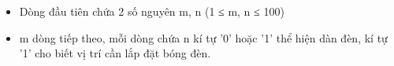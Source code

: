\begin{itemize}
	\item     Dòng đầu tiên chứa 2 số nguyên m, n (1 ≤ m, n ≤ 100)   
	\item     m dòng tiếp theo, mỗi dòng chứa n kí tự '0' hoặc '1' thể hiện dàn đèn, kí tự '1' cho biết vị trí cần lắp đặt bóng đèn.   
\end{itemize}

\